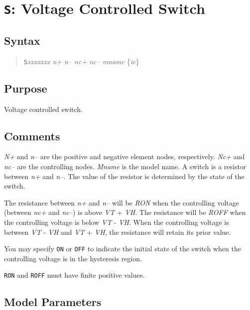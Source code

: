 \section{{\tt S}: Voltage Controlled Switch}
\subsection{Syntax}
\begin{verse}
{\tt S}{\it xxxxxxx n+ n-- nc+ nc-- mname} \{{\it ic}\}
\end{verse}
\subsection{Purpose}

Voltage controlled switch.
\subsection{Comments}

{\it N+} and {\it n--} are the positive and negative element nodes,
respectively.  {\it Nc+} and {\it nc--} are the controlling nodes.
{\it Mname} is the model name.  A switch is a resistor between {\it
n+} and {\it n--}.  The value of the resistor is determined by the
state of the switch.

The resistance between {\it n+} and {\it n--} will be {\it RON}
when the controlling voltage (between {\it nc+} and {\it nc--}) is
above {\it VT} + {\it VH}.  The resistance will be {\it ROFF} when
the controlling voltage is below {\it VT} - {\it VH}.  When the
controlling voltage is between {\it VT} - {\it VH} and {\it VT} +
{\it VH}, the resistance will retain its prior value.

You may specify {\tt ON} or {\tt OFF} to indicate the initial state
of the switch when the controlling voltage is in the hysteresis
region.

{\tt RON} and {\tt ROFF} must have finite positive values.
\subsection{Model Parameters}

